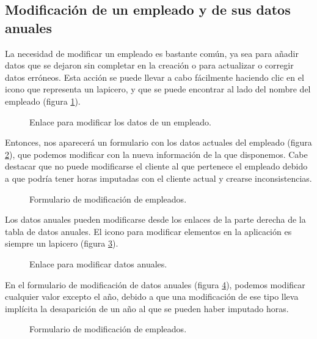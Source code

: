 \subsection{Modificación de un empleado y de sus datos anuales}

La necesidad de modificar un empleado es bastante común, ya sea para añadir
datos que se dejaron sin completar en la creación o para actualizar o corregir
datos erróneos. Esta acción se puede llevar a cabo fácilmente haciendo clic en
el icono que representa un lapicero, y que se puede encontrar al lado del
nombre del empleado (figura \ref{fig:mod_persona}).

\begin{figure}
\centering
{}
\caption{Enlace para modificar los datos de un empleado.}
\label{fig:mod_persona}
\end{figure}

Entonces, nos aparecerá un formulario con los datos actuales del empleado
(figura \ref{fig:form_mod_persona}), que podemos modificar con la nueva
información de la que disponemos. Cabe destacar que no puede modificarse el
cliente al que pertenece el empleado debido a que podría tener horas imputadas
con el cliente actual y crearse inconsistencias.

\begin{figure}
\centering
{}
\caption{Formulario de modificación de empleados.}
\label{fig:form_mod_persona}
\end{figure}

Los datos anuales pueden modificarse desde los enlaces de la parte derecha de
la tabla de datos anuales. El icono para modificar elementos en la aplicación es
siempre un lapicero (figura \ref{fig:mod_anuales}).

\begin{figure}
\centering
{}
\caption{Enlace para modificar datos anuales.}
\label{fig:mod_anuales}
\end{figure}

En el formulario de modificación de datos anuales (figura
\ref{fig:form_mod_anuales}), podemos modificar cualquier valor excepto el año,
debido a que una modificación de ese tipo lleva implícita la desaparición de un
año al que se pueden haber imputado horas.

\begin{figure}
\centering
{}
\caption{Formulario de modificación de empleados.}
\label{fig:form_mod_anuales}
\end{figure}

